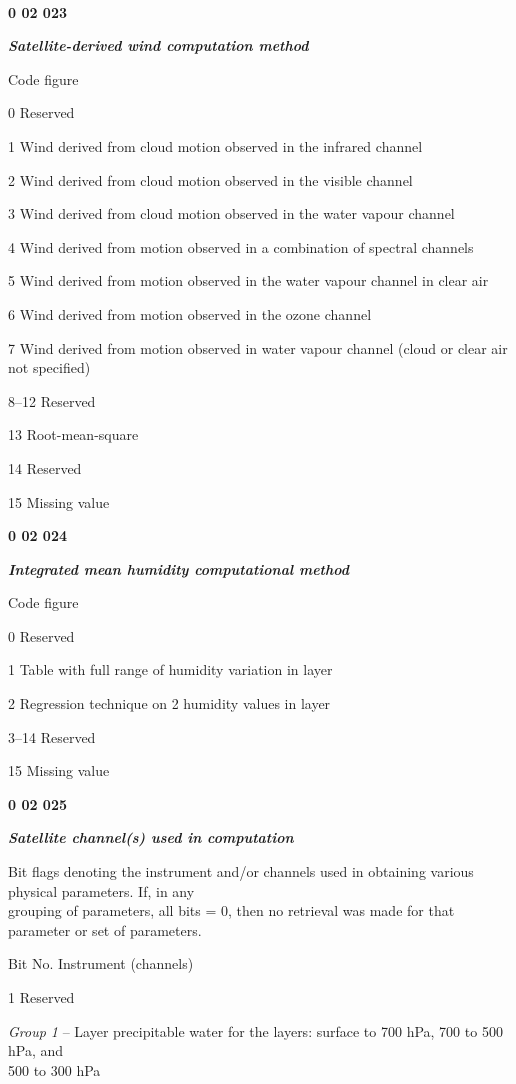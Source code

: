 \textbf{\\
}

\textbf{0 02 023}

\emph{\textbf{Satellite-derived wind computation method}}

Code figure

0 Reserved

1 Wind derived from cloud motion observed in the infrared channel

2 Wind derived from cloud motion observed in the visible channel

3 Wind derived from cloud motion observed in the water vapour channel

4 Wind derived from motion observed in a combination of spectral channels

5 Wind derived from motion observed in the water vapour channel in clear air

6 Wind derived from motion observed in the ozone channel

7 Wind derived from motion observed in water vapour channel (cloud or clear air not specified)

8--12 Reserved

13 Root-mean-square

14 Reserved

15 Missing value

\textbf{0 02 024}

\emph{\textbf{Integrated mean humidity computational method}}

Code figure

0 Reserved

1 Table with full range of humidity variation in layer

2 Regression technique on 2 humidity values in layer

3--14 Reserved

15 Missing value

\textbf{0 02 025}

\emph{\textbf{Satellite channel(s) used in computation}}

Bit flags denoting the instrument and/or channels used in obtaining various physical parameters. If, in any\\
grouping of parameters, all bits = 0, then no retrieval was made for that parameter or set of parameters.

Bit No. Instrument (channels)

1 Reserved

\emph{Group 1} -- Layer precipitable water for the layers: surface to 700 hPa, 700 to 500 hPa, and\\
500 to 300 hPa

